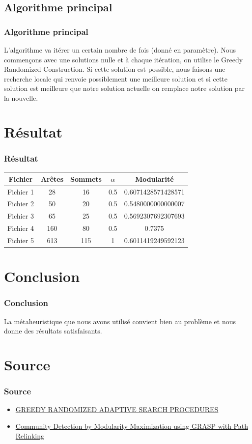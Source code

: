 \documentclass[compress]{beamer}
\begin{document}
\subsection{Algorithme principal}
\begin{frame}
\frametitle{Algorithme principal}
	L'algorithme va itérer un certain nombre de fois (donné en paramètre). Nous commençons avec une solutions nulle et à chaque itération, on utilise le Greedy Randomized Construction. Si cette solution est possible, nous faisons une recherche locale qui renvoie possiblement une meilleure solution et si cette solution est meilleure que notre solution actuelle on remplace notre solution par la nouvelle.
\end{frame}
\section{Résultat}
\begin{frame}
  \frametitle{Résultat}

  \begin{tabular}{|c|c|c|c|c|}
  \hline
  Fichier & Arêtes & Sommets &$ \alpha$ & Modularité \\
  \hline
  Fichier 1 & 28 & 16 & 0.5 &0.6071428571428571 \\
  Fichier 2 & 50 & 20 & 0.5 &0.5480000000000007 \\ 
  Fichier 3 & 65 & 25 & 0.5 &0.5692307692307693 \\
  Fichier 4 & 160 & 80 & 0.5 &0.7375 \\
  Fichier 5 & 613 & 115 & 1 &0.6011419249592123\\
  \hline
  
  \end{tabular}
\end{frame}

\section{Conclusion}
\begin{frame}
	\frametitle{Conclusion}
	La métaheuristique que nous avons utilisé convient bien au problème et nous donne des résultats satisfaisants.
\end{frame}

\section{Source}
\begin{frame}
\frametitle{Source}
	\begin{itemize}
	\item \href{https://sci2s.ugr.es/sites/default/files/files/Teaching/GraduatesCourses/Metaheuristicas/Bibliography/GRASP.pdf}{GREEDY RANDOMIZED ADAPTIVE
SEARCH PROCEDURES}
	\item \href{https://www.cc.gatech.edu/dimacs10/papers/[12]-NascimentoandPitsoulis_v3.pdf}{Community Detection by Modularity
Maximization using GRASP with Path Relinking}
	\end{itemize}
\end{frame}
\end{document}
